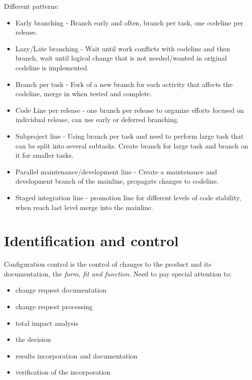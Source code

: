 Different patterns:
\begin{itemize}
    \item Early branching - Branch early and often, branch per task, one codeline per release.
    \item Lazy/Late branching - Wait until work conflicts with codeline and then branch, wait until logical change that is not needed/wanted in original codeline is implemented.
    \item Branch per task - Fork of a new branch for each activity that affects the codeline, merge in when tested and complete.
    \item Code Line per release - one branch per release to organize efforts focused on individual release, can use early or deferred branching.
    \item Subproject line - Using branch per task and need to perform large task that can be split into several subtasks. Create branch for large task and branch on it for smaller tasks.
    \item Parallel maintenance/development line - Create a maintenance and development branch of the mainline, propagate changes to codeline.
    \item Staged integration line - promotion line for different levels of code stability, when reach last level merge into the mainline.
\end{itemize}

\section{Identification and control}
Configuration control is the control of changes to the product and its documentation, the \textit{form, fit and function}. 
Need to pay special attention to:
\begin{itemize}
    \item change request documentation
    \item change request processing
    \item total impact analysis
    \item the decision
    \item results incorporation and documentation
    \item verification of the incorporation
\end{itemize}

